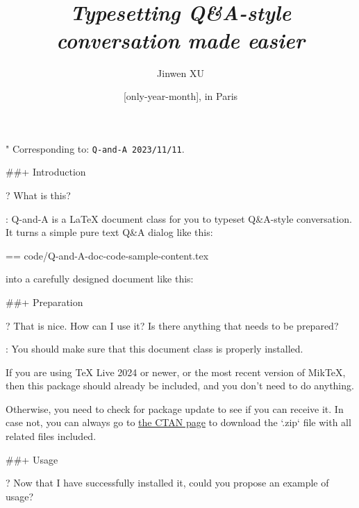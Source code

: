 \documentclass[%
  use style = classical,
  scroll,
]{Q-and-A}
\title{\QApackage{}\\\smallskip\itshape Typesetting Q\&A-style conversation made easier}
\author{Jinwen XU}
\date{\TheDate{\PackageVersion}[only-year-month], in Paris}
\def\PackageVersion{2023/11/11}
\def\PackageSubVersion{}
\newcommand{\QApackage}{{\normalfont\textsf{Q-and-A}}}
\begin{document}
\maketitle

"
  Corresponding to: {\normalfont\texttt{\QApackage{}~\PackageVersion\PackageSubVersion}}.


##+ {Introduction}

?
  What is this?

:
  \QApackage{} is a \LaTeX{} document class for you to typeset Q\&A-style conversation. It turns a simple pure text Q\&A dialog like this:

  == {code/Q-and-A-doc-code-sample-content.tex}

  into a carefully designed document like this:

  \begin{center}
  \end{center}


##+ {Preparation}

?
  That is nice. How can I use it? Is there anything that needs to be prepared?

:
  You should make sure that this document class is properly installed.

  If you are using TeX Live 2024 or newer, or the most recent version of MikTeX, then this package should already be included, and you don't need to do anything.

  Otherwise, you need to check for package update to see if you can receive it. In case not, you can always go to \href{https://ctan.org/pkg/Q-and-A}{the CTAN page} to download the `.zip` file with all related files included.


##+ {Usage}

?
  Now that I have successfully installed it, could you propose an example of usage?
\end{document}
